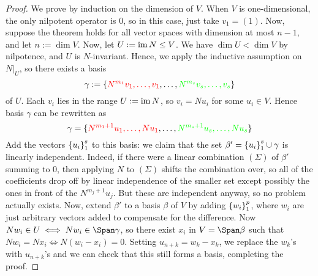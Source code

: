 \documentclass{article}
\newcommand{\red}{\textcolor{red}}
\begin{document}
\begin{proof}
We prove by induction on the dimension of $V$. When $V$ is one-dimensional, the only nilpotent operator is $0$, so in this case, just take $v_1 = (1)$. Now, suppose the theorem holds for all vector spaces with dimension at most $n-1$, and let $n := \dim V$. Now, let $U := \operatorname{im} N \leq V$. We have $\dim U < \dim V$ by nilpotence, and $U$ is $N$-invariant. Hence, we apply the inductive assumption on $N|_U$, so there exists a basis
$$\gamma := \{\red{N^{m_1}v_1, \ldots, v_1}, \ldots, \aq{N^{m_s}v_s, \ldots, v_s}\}$$
of $U$. Each $v_i$ lies in the range $U := \operatorname{im} N$, so $v_i = Nu_i$ for some $u_i\in V$. Hence basis $\gamma$ can be rewritten as
$$\gamma= \{\red{N^{m_1+1}u_1, \ldots, Nu_1}, \ldots, \aq{N^{m_s+1}u_s, \ldots, Nu_s}\}$$
Add the vectors $\left\{u_i\right\}_1^s$ to this basis: we claim that the set $\beta' = \left\{u_i\right\}_1^s\cup \gamma$ is linearly independent. Indeed, if there were a linear combination $(\Sigma)$ of $\beta'$ summing to $0$, then applying $N$ to $(\Sigma)$ shifts the combination over, so all of the coefficients drop off by linear independence of the smaller set except possibly the ones in front of the $N^{m_j + 1}u_j$. But these are independent anyway, so no problem actually exists. Now, extend $\beta'$ to a basis $\beta$ of $V$ by adding $\left\{w_i\right\}_1^p$, where $w_i$ are just arbitrary vectors added to compensate for the difference. Now $Nw_i \in U \iff Nw_i \in \Span \gamma$, so there exist $x_i$ in $V = \Span\beta$ such that $Nw_i = Nx_i \iff N(w_i - x_i) = 0$. Setting $u_{n+k} = w_k - x_k$, we replace the $w_k$'s with $u_{n+k}$'s and we can check that this still forms a basis, completing the proof.
\end{proof}
\newpage
{}
\end{document}
